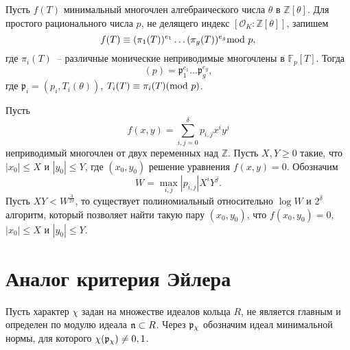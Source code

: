 \documentclass[_00_autoref.tex]{subfiles}
\begin{document}
\begin{statement}\label{statement:dedekind}
    Пусть $f(T)$ минимальный многочлен алгебраического числа $\theta$ в $\mathbb{Z}[\theta]$.
    Для простого рационального числа $p$, не делящего индекс $[\mathcal{O}_K:\mathbb{Z}[\theta]]$, запишем
    \begin{equation*}
        f(T) \equiv (\pi_1(T))^{e_1}\dots (\pi_g(T))^{e_g} \textrm{mod } p,
    \end{equation*}
    где $\pi_i(T)$~-- различные монические неприводимые многочлены в $\mathbb{F}_p[T]$.
    Тогда
    \begin{equation*}
        (p) = \mathfrak{p}_1^{e_1}\dots \mathfrak{p}_g^{e_g},
    \end{equation*}
    где $\mathfrak{p}_i = (p_i, T_i(\theta))$, $T_i(T) \equiv \pi_i(T)(\textrm{mod } p)$.
\end{statement}

\begin{statement}\label{statement:coppersmith}
    Пусть
    \begin{equation*}
        f(x, y) = \sum\limits_{i, j = 0}^{\delta} p_{i, j} x^i y^j
    \end{equation*}
    неприводимый многочлен от двух переменных над $\mathbb{Z}$.
    Пусть $X, Y \ge 0$ такие, что $|x_0| \le X$ и $|y_0| \le Y$, где $(x_0, y_0)$ решение уравнения $f(x, y) = 0$.
    Обозначим
    \begin{equation*}
        W = \max_{i, j} |p_{i, j}| X^i Y^j.
    \end{equation*}
    Пусть $XY < W^{\frac{3}{2\delta}}$, то существует полиномиальный относительно $\log W$ и $2^\delta$ алгоритм, который позволяет найти такую пару $(x_0, y_0)$, что $f(x_0, y_0) = 0$, $|x_0| \le X$ и $|y_0| \le Y$.
\end{statement}

\section{Аналог критерия Эйлера}

\begin{definition}
    Пусть характер $\chi$ задан на множестве идеалов кольца $R$, не является главным и определен по модулю идеала $\mathfrak{n} \subset R$.
    Через $\mathfrak{p}_{\chi}$ обозначим идеал минимальной нормы, для которого $\chi(\mathfrak{p}_{\chi}) \neq 0, 1$.
\end{definition}
\end{document}
